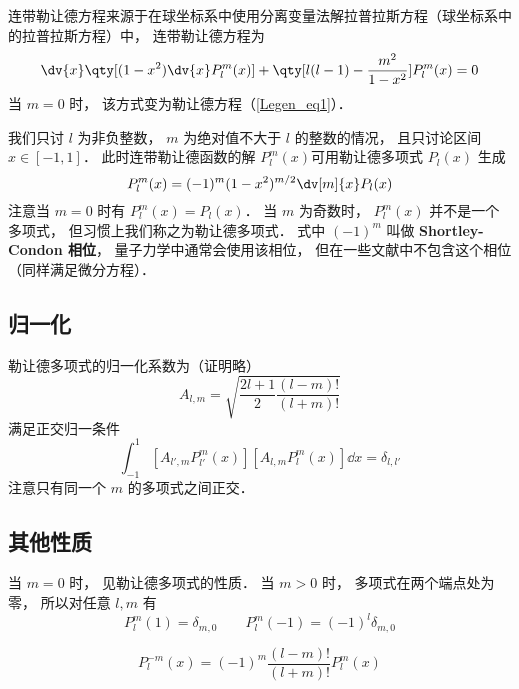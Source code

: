 

连带勒让德方程来源于在球坐标系中使用分离变量法解拉普拉斯方程（球坐标系中的拉普拉斯方程）中， 连带勒让德方程为
\begin{equation}
\dv{x} \qty[(1-x^2)\dv{x} P_l^m(x)] + \qty[l(l-1) - \frac{m^2}{1-x^2}]P_l^m(x) = 0
\end{equation}
当 $m = 0$ 时， 该方式变为勒让德方程（\autoref{Legen_eq1}）．

我们只讨 $l$ 为非负整数， $m$ 为绝对值不大于 $l$ 的整数的情况， 且只讨论区间 $x\in [-1,1]$． 此时连带勒让德函数的解 $P_l^m(x)$可用勒让德多项式 $P_l(x)$ 生成
\begin{equation}
P_l^m(x) = (-1)^m (1 - x^2)^{m/2} \dv[m]{x} P_l(x)
\end{equation}
注意当 $m = 0$ 时有 $P_l^m(x) = P_l(x)$． 当 $m$ 为奇数时， $P_l^m(x)$ 并不是一个多项式， 但习惯上我们称之为勒让德多项式． 式中 $(-1)^m$ 叫做 \textbf{Shortley-Condon 相位}， 量子力学中通常会使用该相位， 但在一些文献中不包含这个相位（同样满足微分方程）．

\subsection{归一化}
勒让德多项式的归一化系数为（证明略）
\begin{equation}\label{AsLgdr_eq3}
A_{l,m} = \sqrt{\frac{2l+1}{2}\frac{(l-m)!}{(l+m)!}}
\end{equation}
满足正交归一条件
\begin{equation}\label{AsLgdr_eq4}
\int_{-1}^1 [A_{l',m} P_{l'}^{m}(x)] [A_{l,m} P_l^{m}(x)] \dd{x} = \delta_{l,l'}
\end{equation}
注意只有同一个 $m$ 的多项式之间正交．

\subsection{其他性质}
当 $m = 0$ 时， 见勒让德多项式的性质． 当 $m > 0$ 时， 多项式在两个端点处为零， 所以对任意 $l, m$ 有
\begin{equation}
P_l^m(1) = \delta_{m, 0}
\qquad
P_l^m(-1) = (-1)^l \delta_{m, 0}
\end{equation}

\begin{equation}
P_l^{-m}(x) = (-1)^m \frac{(l-m)!}{(l+m)!} P_l^m(x)
\end{equation}
